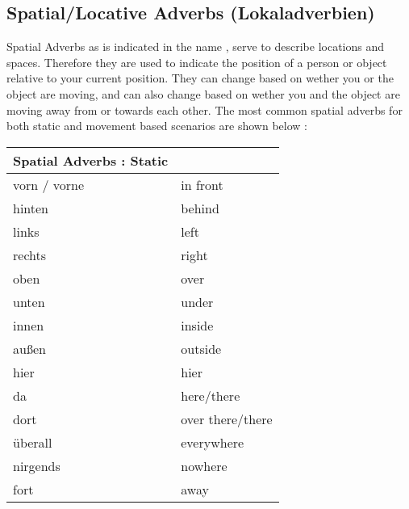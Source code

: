 \documentclass[a4paper,12pt]{article}
\begin{document}
\subsection{\bf{Spatial/Locative Adverbs (Lokaladverbien)}}
\begin{adjustwidth}{2em}{0pt}
\label{sec:spatial_adverbs}

Spatial Adverbs as is indicated in the name , serve to describe locations and
spaces. Therefore they are used to indicate the position of a person or object
relative to your current position. They can change based on wether you or the
object are moving, and can also change based on wether you and the object are
moving away from or towards each other. The most common spatial adverbs for both
static and movement based scenarios are shown below :

\begin{minipage}{0.4\textwidth}
\vspace{0.3cm}
\begin{tabular}{l|l}

\toprule
\rowcolor{goethe_green}
\multicolumn{2}{c}
{\color{white} \textbf{Spatial Adverbs : Static} \color{black}} \\
\midrule

\rowcolor{white}     vorn / vorne & in front\\
\rowcolor{lightgray} hinten       & behind\\
\rowcolor{white}     links        & left\\
\rowcolor{lightgray} rechts       & right\\
\rowcolor{white}     oben         & over\\
\rowcolor{lightgray} unten        & under\\
\rowcolor{white}     innen        & inside\\
\rowcolor{lightgray} außen        & outside\\
\rowcolor{white}     hier         & hier\\
\rowcolor{lightgray} da           & here/there\\
\rowcolor{white}     dort         & over there/there\\
\rowcolor{lightgray} überall      & everywhere\\
\rowcolor{white}     nirgends     & nowhere\\
\rowcolor{lightgray} fort      & away\\

\bottomrule
\end{tabular}
\vspace{0.3cm}
\newline
\end{minipage}
\begin{minipage}{0.4\textwidth}
\vspace{0.3cm}
\begin{tabular}{l|l}


\end{tabular}
\end{minipage}
\end{adjustwidth}
\end{document}
